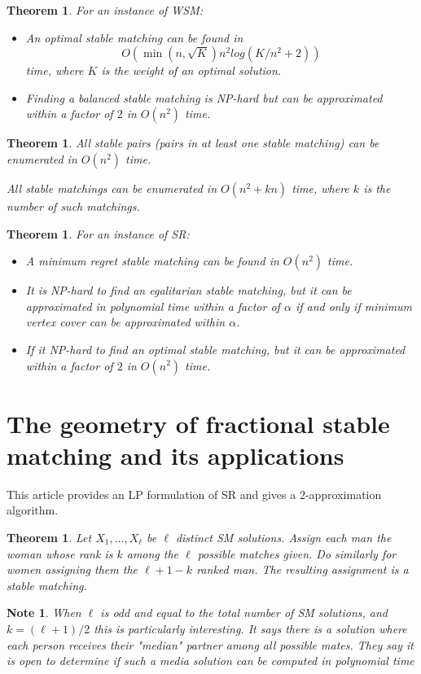 \documentclass{article}
\newtheorem{theorem}[fact]{Theorem}
\newtheorem{note}[fact]{Note}
\begin{document}
\begin{theorem}
For an instance of WSM:
\begin{itemize}
\item An optimal stable matching can be found in $$O(\min(n,\sqrt{K})n^2log(K/n^2 + 2))$$ time, where $K$ is the weight of an optimal solution.
\item Finding a balanced stable matching is NP-hard but can be approximated within a factor of $2$ in $O(n^2)$ time.
\end{itemize}
\end{theorem}
\begin{theorem}
\item All stable pairs (pairs in at least one stable matching) can be enumerated in $O(n^2)$ time.
\item All stable matchings can be enumerated in $O(n^2 + kn)$ time, where $k$ is the number of such matchings.
\end{theorem}
\begin{theorem}
For an instance of SR:
\begin{itemize}
\item A minimum regret stable matching can be found in $O(n^2)$ time.
\item It is NP-hard to find an egalitarian stable matching, but it can be approximated in polynomial time within a factor of $\alpha$ if and only if minimum vertex cover can be approximated within $\alpha$.
\item If it NP-hard to find an optimal stable matching, but it can be approximated within a factor of $2$ in $O(n^2)$ time.
\end{itemize}
\end{theorem}

\section{The geometry of fractional stable matching and its applications}
This article \cite{teo1998geometry} provides an LP formulation of SR and gives a $2$-approximation algorithm.

\begin{theorem}
Let $X_1, \dots, X_\ell$ be $\ell$ distinct SM solutions. Assign each man the woman whose rank is $k$ among the $\ell$ possible matches given. Do similarly for women assigning them the $\ell +1 -k$ ranked man. The resulting assignment is a stable matching.
\end{theorem}
 \begin{note}
 When $\ell$ is odd and equal to the total number of SM solutions, and $k = (\ell + 1)/2$ this is particularly interesting. It says there is a solution where each person receives their "median" partner among all possible mates. They say it is open to determine if such a media solution can be computed in polynomial time
 \end{note}
\end{document}
